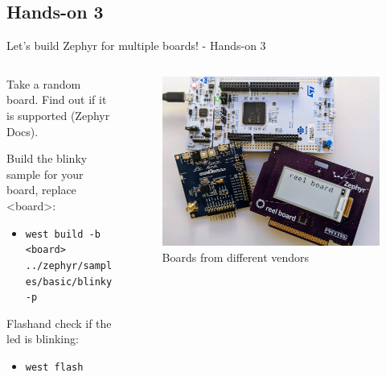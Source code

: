 \documentclass[10pt, aspectratio=169]{beamer}
\begin{document}
\subsection{Hands-on 3}
\begin{frame}[fragile]{Let's build Zephyr for multiple boards! - Hands-on 3}
  \begin{columns}
    \begin{column}{0.6\textwidth}
       Take a random board. Find out if it is supported (Zephyr Docs).

       Build the blinky sample for your board, replace <board>:
       \begin{itemize}
               \item \tiny\texttt{west build -b <board> ../zephyr/samples/basic/blinky -p}
       \end{itemize}

       Flash\footnotemark[1] and check if the led is blinking:
       \begin{itemize}
         \item \scriptsize\texttt{west flash}
       \end{itemize}

    \end{column}
    \begin{column}{0.4\textwidth}
      \begin{figure}
        \includegraphics[width=1.1\textwidth]{images/boards.jpg}
        \caption*{Boards from different vendors}
      \end{figure}
    \end{column}
  \end{columns}
\end{frame}
\end{document}
